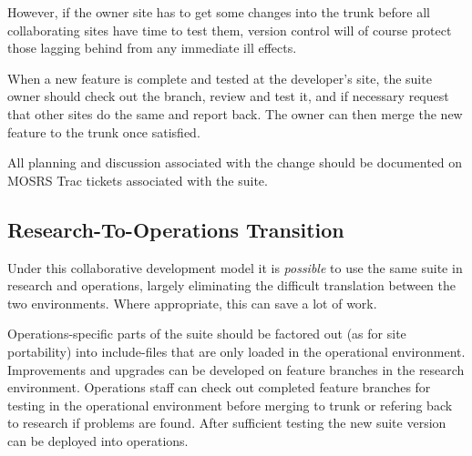 However, if the owner site has to get some changes into the trunk before all
collaborating sites have time to test them, version control will of course
protect those lagging behind from any immediate ill effects.

When a new feature is complete and tested at the developer's site, the suite
owner should check out the branch, review and test it, and if necessary request
that other sites do the same and report back. The owner can then merge the
new feature to the trunk once satisfied.

All planning and discussion associated with the change should be documented on
MOSRS Trac tickets associated with the suite.

\subsection{Research-To-Operations Transition}

Under this collaborative development model it is {\em possible} to use the
same suite in research and operations, largely eliminating the difficult
translation between the two environments. Where appropriate, this can save
a lot of work.

Operations-specific parts of the suite should be factored out (as for site
portability) into include-files that are only loaded in the operational
environment. Improvements and upgrades can be developed on feature branches in
the research environment. Operations staff can check out completed feature
branches for testing in the operational environment before merging to trunk or
refering back to research if problems are found. After sufficient testing the
new suite version can be deployed into operations.

